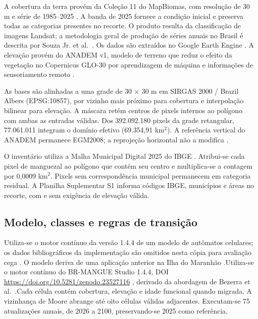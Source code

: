 \documentclass[12pt,a4paper]{article}
\begin{document}
A cobertura da terra provém da Coleção 11 do MapBiomas, com resolução de 30 m e série de 1985--2025 \citep{mapbiomas2026}. A banda de 2025 fornece a condição inicial e preserva todas as categorias presentes no recorte. O produto resulta da classificação de imagens Landsat; a metodologia geral de produção de séries anuais no Brasil é descrita por Souza Jr. et al.\ \citeyearpar{souzajr2020}. Os dados são extraídos no Google Earth Engine \citep{gorelick2017}. A elevação provém do ANADEM v1, modelo de terreno que reduz o efeito da vegetação no Copernicus GLO-30 por aprendizagem de máquina e informações de sensoriamento remoto \citep{laipelt2024}.

As bases são alinhadas a uma grade de 30 $\times$ 30 m em SIRGAS 2000 / Brazil Albers (EPSG:10857), por vizinho mais próximo para cobertura e interpolação bilinear para elevação. A máscara retém centros de pixels internos ao polígono com ambas as entradas válidas. Dos 392.092.180 pixels da grade retangular, 77.061.011 integram o domínio efetivo (69.354,91 km$^2$). A referência vertical do ANADEM permanece EGM2008; a reprojeção horizontal não a modifica \citep{anadem2025}.

O inventário utiliza a Malha Municipal Digital 2025 do IBGE \citep{ibge2025}. Atribui-se cada pixel de manguezal ao polígono que contém seu centro e multiplica-se a contagem por 0,0009 km$^2$. Pixels sem correspondência municipal permanecem em categoria residual. A Planilha Suplementar S1 informa códigos IBGE, municípios e áreas no recorte, com e sem exigência de elevação válida.

\subsection{Modelo, classes e regras de transição}
\ifdefined\VersaoCega Utiliza-se o motor contínuo da versão 1.4.4 de um modelo de autômatos celulares; os dados bibliográficos da implementação são omitidos nesta cópia para avaliação cega \citep{studio2026}. O modelo deriva de uma aplicação anterior na Ilha do Maranhão \citeyearpar{bezerra2014}.\else Utiliza-se o motor contínuo do BR-MANGUE Studio 1.4.4, DOI \url{https://doi.org/10.5281/zenodo.23527116} \citep{studio2026}, derivado da abordagem de Bezerra et al.\ \citeyearpar{bezerra2014}.\fi\space Cada célula contém cobertura, elevação e idade funcional quando migrada. A vizinhança de Moore abrange até oito células válidas adjacentes. Executam-se 75 atualizações anuais, de 2026 a 2100, preservando-se 2025 como referência.
\end{document}
